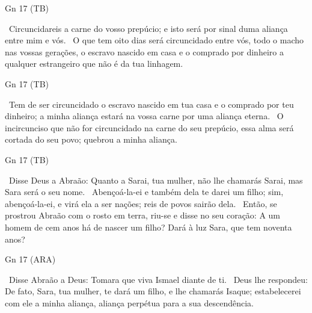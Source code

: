 \documentclass[12pt,aspectratio=169]{beamer}
\newcommand{\ver}[1]{%
    \raisebox{0.50ex}{%
        \scalebox{1.1}{%
            \pmb{\textbf{\textcolor{BSpbg}{#1}}}%
        }%
    }%
}
\newcommand{\QUOTE}[1]{%
    \par\noindent\hspace*{0.05\linewidth}%
    \begin{minipage}{0.9\linewidth}%
        \linespread{1.35}\large{#1}%
    \end{minipage}%
}
\newcommand{\RED}[1]{{\textcolor{TXred}{#1}}}
\newcommand{\ORA}[1]{{\textcolor{TXred!50!TXyel}{#1}}}
\newcommand{\YEL}[1]{{\textcolor{TXyel}{#1}}}
\newcommand{\GRE}[1]{{\textcolor{TXgre}{#1}}}
\newcommand{\CYA}[1]{{\textcolor{TXcya}{#1}}}
\newcommand{\MAG}[1]{{\textcolor{TXmag}{#1}}}
\newcommand{\BRI}[1]{{\textcolor{BSpbg}{#1}}}   %
\begin{document}
    \begin{frame}{\BRI{Gn 17} (TB)}
        \QUOTE{%
            \ver{11}~\MAG{Circuncidareis} a carne do vosso prepúcio; e isto será por \YEL{sinal
            duma aliança} entre mim e vós.
            \ver{12}~O que tem \GRE{oito dias} será circuncidado entre vós, todo o macho nas
            vossas gerações, o \YEL{escravo nascido} em casa \ORA{e o comprado} por dinheiro a
            qualquer \ORA{estrangeiro que não é da tua linhagem}.
        }
    \end{frame}

    \begin{frame}{\BRI{Gn 17} (TB)}
        \QUOTE{%
            \ver{13}~Tem de ser circuncidado o escravo nascido em tua casa e o comprado por teu
            dinheiro; a minha aliança estará na vossa carne por uma \YEL{aliança eterna}.
            \ver{14}~O \RED{incircunciso} que não for circuncidado na carne do seu prepúcio,
            \YEL{essa alma} será cortada do seu povo; \RED{quebrou} a minha aliança.
        }
    \end{frame}

    \begin{frame}{\BRI{Gn 17} (TB)}
        \QUOTE{%
            \ver{15}~Disse Deus a Abraão: Quanto a Sarai, tua mulher, não lhe chamarás Sarai,
            mas \YEL{Sara} será o seu nome.
            \ver{16}~Abençoá-la-ei e também \YEL{dela} te darei um filho; sim, abençoá-la-ei, e
            virá ela a ser nações; \MAG{reis} de povos sairão \YEL{dela}.
            \ver{17}~Então, se prostrou Abraão com o rosto em terra, riu-se e disse no seu
            coração: A um homem de cem anos há de nascer um filho? Dará à luz Sara, que tem
            noventa anos?
        }
    \end{frame}

    \begin{frame}{\BRI{Gn 17} (ARA)}
        \QUOTE{%
            \ver{18}~Disse Abraão a Deus: Tomara que viva Ismael diante de ti.
            \ver{19}~Deus lhe respondeu: \CYA{De fato}, Sara, tua mulher, te dará um filho, e
            lhe chamarás \GRE{Isaque}; \YEL{estabelecerei com ele a minha aliança, aliança
            perpétua para a sua descendência}.
        }
    \end{frame}
\end{document}

